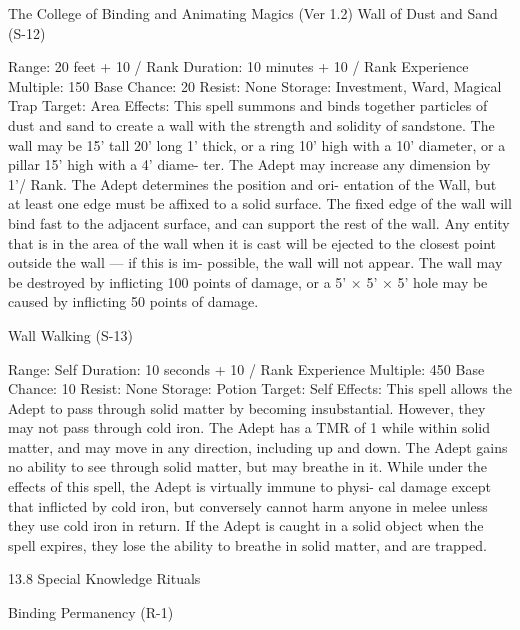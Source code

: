 \begin{Chapter}{The College of Binding and Animating Magics (Ver 1.2)}
Wall of Dust and Sand (S-12) 

Range: 20 feet + 10 / Rank 
Duration: 10 minutes + 10 / Rank 
Experience Multiple: 150 
Base Chance: 20%
Resist: None 
Storage: Investment, Ward, Magical Trap 
Target: Area 
Effects:  This  spell  summons  and  binds  together 
particles of dust and sand to create a wall with the 
strength and solidity of sandstone. The wall may be 
15’ tall 20’ long 1’ thick, or a ring 10’ high with a 
10’ diameter, or a pillar 15’ high with a 4’ diame-
ter. The  Adept may increase any dimension by 1’/ 
Rank.  The  Adept  determines  the  position  and  ori-
entation of the Wall, but at least one edge must be 
affixed  to  a  solid  surface.  The  fixed  edge  of  the 
wall will bind fast to the adjacent surface, and can 
support the rest of the wall. Any entity that is in the 
area  of  the  wall  when  it  is  cast  will  be  ejected  to 
the  closest  point  outside  the  wall  —  if  this  is  im-
possible, the wall will not appear. The wall may be 
destroyed  by  inflicting 100  points  of  damage,  or  a 
5’  ×  5’  ×  5’  hole  may  be  caused  by  inflicting  50 
points of damage. 

Wall Walking (S-13) 

Range: Self 
Duration: 10 seconds + 10 / Rank 
Experience Multiple: 450 
Base Chance: 10%
Resist: None 
Storage: Potion 
Target: Self 
Effects: This spell allows the Adept to pass through 
solid  matter  by  becoming  insubstantial.  However, 
they  may  not  pass  through  cold  iron.  The  Adept 
has a TMR of 1 while within solid matter, and may 
move in any direction, including up and down. The 
Adept gains no ability to see through solid matter, 
but  may  breathe  in  it.  While  under  the  effects  of 
this  spell,  the  Adept  is  virtually  immune  to  physi-
cal  damage  except  that  inflicted  by  cold  iron,  but 
conversely  cannot  harm  anyone  in  melee  unless 
they use cold iron in return. If the Adept is caught 
in  a  solid  object  when  the  spell  expires,  they  lose 
the  ability  to  breathe  in  solid  matter,  and  are 
trapped. 

13.8 Special Knowledge Rituals 

Binding Permanency (R-1) 


\end{Chapter}
